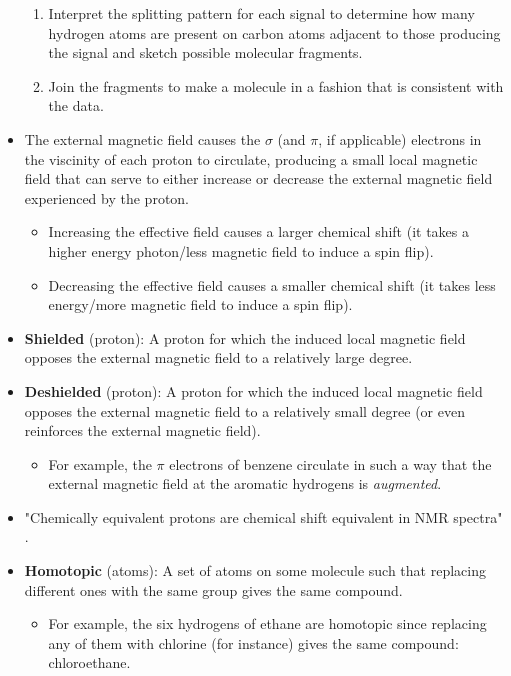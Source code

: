 \documentclass[../notes.tex]{subfiles}
\begin{document}
\begin{itemize}
\begin{enumerate}
        \item Interpret the splitting pattern for each signal to determine how many hydrogen atoms are present on carbon atoms adjacent to those producing the signal and sketch possible molecular fragments.
        \item Join the fragments to make a molecule in a fashion that is consistent with the data.
    \end{enumerate}
    \item The external magnetic field causes the $\sigma$ (and $\pi$, if applicable) electrons in the viscinity of each proton to circulate, producing a small local magnetic field that can serve to either increase or decrease the external magnetic field experienced by the proton.
    \begin{itemize}
        \item Increasing the effective field causes a larger chemical shift (it takes a higher energy photon/less magnetic field to induce a spin flip).
        \item Decreasing the effective field causes a smaller chemical shift (it takes less energy/more magnetic field to induce a spin flip).
    \end{itemize}
    \item \textbf{Shielded} (proton): A proton for which the induced local magnetic field opposes the external magnetic field to a relatively large degree. 
    \item \textbf{Deshielded} (proton): A proton for which the induced local magnetic field opposes the external magnetic field to a relatively small degree (or even reinforces the external magnetic field).
    \begin{itemize}
        \item For example, the $\pi$ electrons of benzene circulate in such a way that the external magnetic field at the aromatic hydrogens is \emph{augmented}.
    \end{itemize}
    \item "Chemically equivalent protons are chemical shift equivalent in  NMR spectra" \parencite[403]{bib:SolomonsEtAl}.
    \item \textbf{Homotopic} (atoms): A set of atoms on some molecule such that replacing different ones with the same group gives the same compound.
    \begin{itemize}
        \item For example, the six hydrogens of ethane are homotopic since replacing any of them with chlorine (for instance) gives the same compound: chloroethane.

\end{itemize}
\end{itemize}
\end{document}
